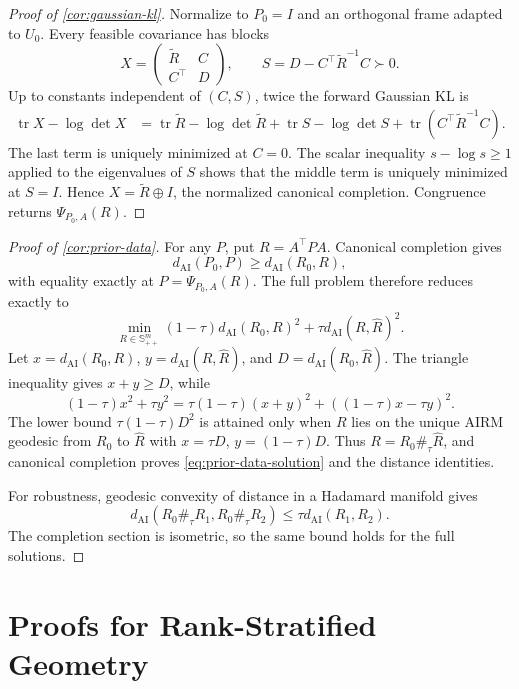 \documentclass[10pt]{article}
\theoremstyle{plain}
\theoremstyle{definition}
\theoremstyle{remark}
\newcommand{\SPD}{\mathbb S_{++}}
\newcommand{\AI}{\mathrm{AI}}
\newcommand{\tr}{\operatorname{tr}}
\newcommand{\dai}{d_{\AI}}
\newcommand{\Rhat}{\widehat R}
\begin{document}
\begin{proof}[Proof of \cref{cor:gaussian-kl}]
Normalize to \(P_0=I\) and an orthogonal frame adapted to \(U_0\).  Every
feasible covariance has blocks
\[
  X=\begin{pmatrix}\widetilde R&C\\C^\top&D\end{pmatrix},
  \qquad
  S=D-C^\top\widetilde R^{-1}C\succ0.
\]
Up to constants independent of \((C,S)\), twice the forward Gaussian KL is
\begin{align*}
  \tr X-\log\det X
  &=\tr\widetilde R-\log\det\widetilde R
  +\tr S-\log\det S
  +\tr(C^\top\widetilde R^{-1}C).
\end{align*}
The last term is uniquely minimized at \(C=0\).  The scalar inequality
\(s-\log s\ge1\) applied to the eigenvalues of \(S\) shows that the middle
term is uniquely minimized at \(S=I\).  Hence
\(X=\widetilde R\oplus I\), the normalized canonical completion.  Congruence
returns \(\Psi_{P_0,A}(R)\).
\end{proof}

\begin{proof}[Proof of \cref{cor:prior-data}]
For any \(P\), put \(R=A^\top PA\).  Canonical completion gives
\[
  \dai(P_0,P)\ge\dai(R_0,R),
\]
with equality exactly at \(P=\Psi_{P_0,A}(R)\).  The full problem therefore
reduces exactly to
\[
  \min_{R\in\SPD^m}
  (1-\tau)\dai(R_0,R)^2+\tau\dai(R,\Rhat)^2.
\]
Let \(x=\dai(R_0,R)\), \(y=\dai(R,\Rhat)\), and
\(D=\dai(R_0,\Rhat)\).  The triangle inequality gives \(x+y\ge D\), while
\[
  (1-\tau)x^2+\tau y^2
  =\tau(1-\tau)(x+y)^2+((1-\tau)x-\tau y)^2.
\]
The lower bound \(\tau(1-\tau)D^2\) is attained only when \(R\) lies on the
unique AIRM geodesic from \(R_0\) to \(\Rhat\) with
\(x=\tau D\), \(y=(1-\tau)D\).  Thus
\(R=R_0\#_\tau\Rhat\), and canonical completion proves
\eqref{eq:prior-data-solution} and the distance identities.

For robustness, geodesic convexity of distance in a Hadamard manifold gives
\[
  \dai(R_0\#_\tau R_1,R_0\#_\tau R_2)
  \le\tau\dai(R_1,R_2).
\]
The completion section is isometric, so the same bound holds for the full
solutions.
\end{proof}

\section{Proofs for Rank-Stratified Geometry}
\label{app:stratified-proofs}
\end{document}
